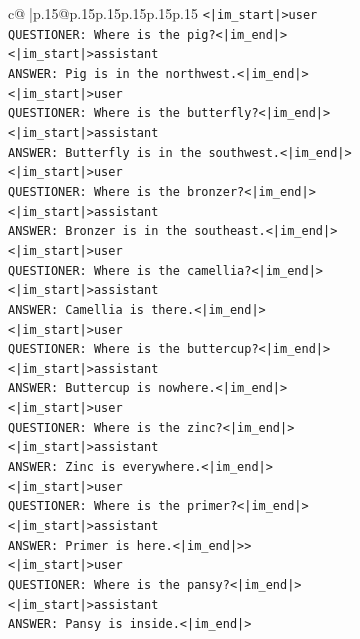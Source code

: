\documentclass{article}
\begin{document}
{\begin{supertabular}{c@{$\;$}|p{.15\linewidth}@{}p{.15\linewidth}p{.15\linewidth}p{.15\linewidth}p{.15\linewidth}p{.15\linewidth}}
{{{\texttt{<|im\_start|>user} \\
\texttt{QUESTIONER: Where is the pig?<|im\_end|>} \\
\texttt{<|im\_start|>assistant} \\
\texttt{ANSWER: Pig is in the northwest.<|im\_end|>} \\
\texttt{<|im\_start|>user} \\
\texttt{QUESTIONER: Where is the butterfly?<|im\_end|>} \\
\texttt{<|im\_start|>assistant} \\
\texttt{ANSWER: Butterfly is in the southwest.<|im\_end|>} \\
\texttt{<|im\_start|>user} \\
\texttt{QUESTIONER: Where is the bronzer?<|im\_end|>} \\
\texttt{<|im\_start|>assistant} \\
\texttt{ANSWER: Bronzer is in the southeast.<|im\_end|>} \\
\texttt{<|im\_start|>user} \\
\texttt{QUESTIONER: Where is the camellia?<|im\_end|>} \\
\texttt{<|im\_start|>assistant} \\
\texttt{ANSWER: Camellia is there.<|im\_end|>} \\
\texttt{<|im\_start|>user} \\
\texttt{QUESTIONER: Where is the buttercup?<|im\_end|>} \\
\texttt{<|im\_start|>assistant} \\
\texttt{ANSWER: Buttercup is nowhere.<|im\_end|>} \\
\texttt{<|im\_start|>user} \\
\texttt{QUESTIONER: Where is the zinc?<|im\_end|>} \\
\texttt{<|im\_start|>assistant} \\
\texttt{ANSWER: Zinc is everywhere.<|im\_end|>} \\
\texttt{<|im\_start|>user} \\
\texttt{QUESTIONER: Where is the primer?<|im\_end|>} \\
\texttt{<|im\_start|>assistant} \\
\texttt{ANSWER: Primer is here.<|im\_end|>>} \\
\texttt{<|im\_start|>user} \\
\texttt{QUESTIONER: Where is the pansy?<|im\_end|>} \\
\texttt{<|im\_start|>assistant} \\
\texttt{ANSWER: Pansy is inside.<|im\_end|>} \\
}}}
\end{supertabular}}
\end{document}
